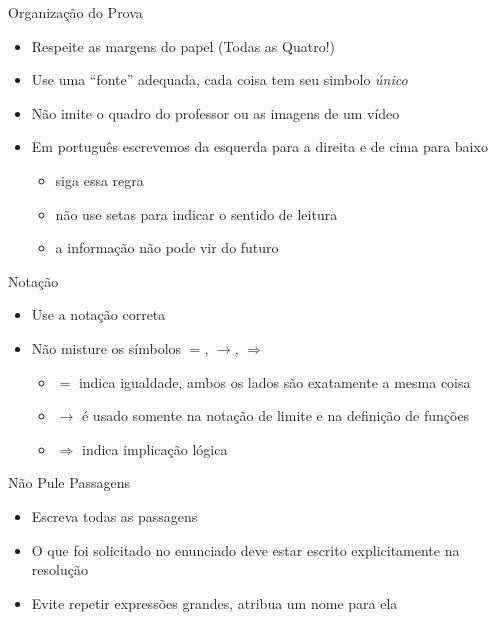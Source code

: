 \documentclass[fleqn,utf8,aspectratio=169,12pt,ignorenonframetext]{beamer}
\begin{document}
\begin{frame}{Organização do Prova}
  \begin{itemize}[<+->]
    \item Respeite as margens do papel (Todas as Quatro!)
    \item Use uma ``fonte'' adequada, cada coisa tem seu simbolo \emph{único}
    \item Não imite o quadro do professor ou as imagens de um vídeo
    \item Em português escrevemos da esquerda para a direita e de cima para baixo
    \begin{itemize}
      \item siga essa regra
      \item não use setas para indicar o sentido de leitura
      \item a informação não pode vir do futuro
    \end{itemize}
  \end{itemize}
\end{frame}

\begin{frame}{Notação}
  \begin{itemize}[<+->]
    \item Use a notação correta
    \item Não misture os símbolos\; $=$,\; $\to$,\; $\Rightarrow$
    \begin{itemize}
      \item \emph{$=$}           \tabto{8mm} indica igualdade, ambos os lados são exatamente a mesma coisa
      \item \emph{$\to$}         \tabto{8mm} é usado somente na notação de limite e na definição de funções
      \item \emph{$\Rightarrow$} \tabto{8mm} indica implicação lógica \\[3mm]
    \end{itemize}
  \end{itemize}
\end{frame}

\begin{frame}{Não Pule Passagens}
  \begin{itemize}[<+->]
    \item Escreva todas as passagens
    \item O que foi solicitado no enunciado deve estar escrito explicitamente na resolução
    \item Evite repetir expressões grandes, atribua um nome para ela
  \end{itemize}
\end{frame}
\end{document}
